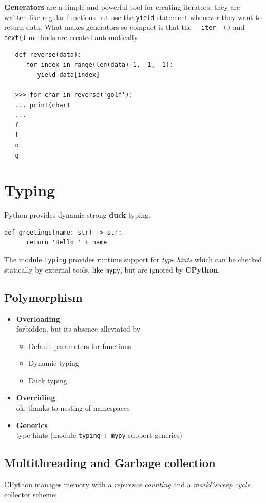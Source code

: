 \textbf{Generators} are a simple and powerful tool for creating iterators:
they are written like regular functions but use the \lstinline|yield| statement whenever they want to return data.
What makes generators so compact is that the \lstinline|__iter__()| and
\lstinline|next()| methods are created automatically
\begin{lstlisting}
   def reverse(data):
      for index in range(len(data)-1, -1, -1):
         yield data[index]

   >>> for char in reverse('golf'):
   ... print(char)
   ...
   f
   l
   o
   g
\end{lstlisting}

\section{Typing}
Python provides dynamic strong \textbf{duck} typing.
\begin{lstlisting}[caption={Code can be annotated with types}]
   def greetings(name: str) -> str:
      return 'Hello ' + name
\end{lstlisting}
The module \lstinline|typing| provides runtime support for \textit{type hints} which can be checked statically by
external tools, like \lstinline|mypy|, but are ignored by \textbf{CPython}.

\subsection{Polymorphism}
\begin{itemize}
   \item \textbf{Overloading}\\
   forbidden, but its absence
   alleviated by
   \begin{itemize}
      \item Default parameters for functions
      \item Dynamic typing
      \item Duck typing
   \end{itemize}
   \item \textbf{Overriding}\\
   ok, thanks to nesting of
   namespaces
   \item \textbf{Generics}\\
   type hints (module \lstinline|typing| + \lstinline|mypy|
   support generics)
\end{itemize}

\subsection{Multithreading and Garbage collection}
CPython manages memory with a \textit{reference counting} and a
\textit{mark\&sweep cycle} collector scheme;

